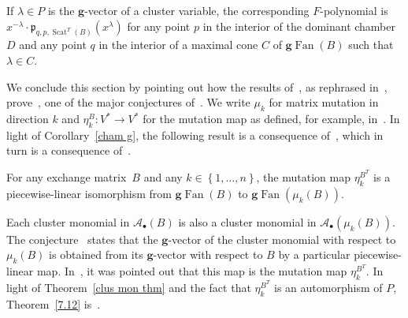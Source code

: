\documentclass[ALCO,ThmDefs,Unicode,epreuves]{cedram}
\DeclareMathOperator{\Scat}{Scat}
\DeclareMathOperator{\Fan}{Fan}
\newcommand{\gFan}{\g\!\Fan}
\newcommand{\set}[1]{{\left\lbrace #1 \right\rbrace}}
\newcommand{\A}{{\mathcal A}}
\newcommand{\p}{{\mathfrak p}}
\newcommand{\g}{\mathbf{g}}
\begin{document}
\begin{coro}\label{clus mon F}
If $\lambda\in P$ is the $\g$-vector of a cluster variable, the corresponding $F$-polynomial is $x^{-\lambda}\cdot\p_{q,p,\Scat^T(B)}(x^\lambda)$ for any point $p$ in the interior of the dominant chamber $D$ and any point $q$ in the interior of a maximal cone $C$ of $\gFan(B)$ such that $\lambda\in C$.
\end{coro}

We conclude this section by pointing out how the results of~\cite{GHKK}, as rephrased in~\cite{scatfan}, prove~\cite[Conjecture~7.12]{ca4}, one of the major conjectures of~\cite{ca4}.
We write $\mu_k$ for matrix mutation in direction $k$ and $\eta_k^B:V^*\to V^*$ for the mutation map as defined, for example, in~\cite[Section~4.1]{scatfan}.
In light of Corollary~\ref{cham g}, the following result is a consequence of~\cite[Corollary~4.5]{scatfan}, which in turn is a consequence of~\cite[Theorem~1.24]{GHKK}.
\begin{theorem}\label{7.12}
For any exchange matrix~$B$ and any $k\in\set{1,\ldots,n}$, the mutation map $\eta^{B^T}_k$ is a piecewise-linear isomorphism from $\gFan(B)$ to $\gFan(\mu_k(B))$.
\end{theorem}

Each cluster monomial in $\A_\bullet(B)$ is also a cluster monomial in $\A_\bullet(\mu_k(B))$.
The conjecture~\cite[Conjecture~7.12]{ca4} states that the $\g$-vector of the cluster monomial with respect to $\mu_k(B)$ is obtained from its $\g$-vector with respect to $B$ by a particular piecewise-linear map.
In~\cite[Section~8]{universal}, it was pointed out that this map is the mutation map $\eta_k^{B^T}$.
In light of Theorem~\ref{clus mon thm} and the fact that $\eta^{B^T}_k$ is an automorphism of $P$, Theorem~\ref{7.12} is~\cite[Conjecture~7.12]{ca4}.

%
%
\end{document}
